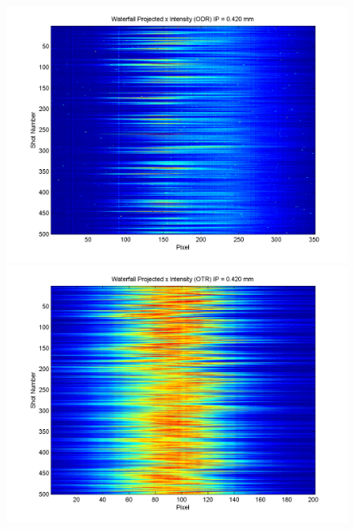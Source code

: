 \documentclass[12pt]{article}
\begin{document}
\begin{figure}
\begin{center}
\includegraphics[scale=0.5]{Figures/ProjX_wfall_ODR_420.PNG}
\includegraphics[scale=0.5]{Figures/ProjX_wfall_OTR_420.PNG}
\caption{}
\end{center}
\end{figure}
\end{document}
